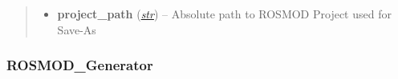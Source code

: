 \documentclass[letterpaper,10pt,english]{sphinxmanual}
\begin{document}
\begin{fulllineitems}
\begin{fulllineitems}
\begin{quote}
\begin{description}
\begin{itemize}
\item {} 
\textbf{project\_path} (\href{http://docs.python.org/library/functions.html\#str}{\emph{str}}) -- Absolute path to ROSMOD Project used for Save-As

\end{itemize}

\end{description}\end{quote}

\end{fulllineitems}


\end{fulllineitems}



\subsubsection{ROSMOD\_Generator}
\label{class_Generator:rosmod-generator}\label{class_Generator::doc}
\end{document}

